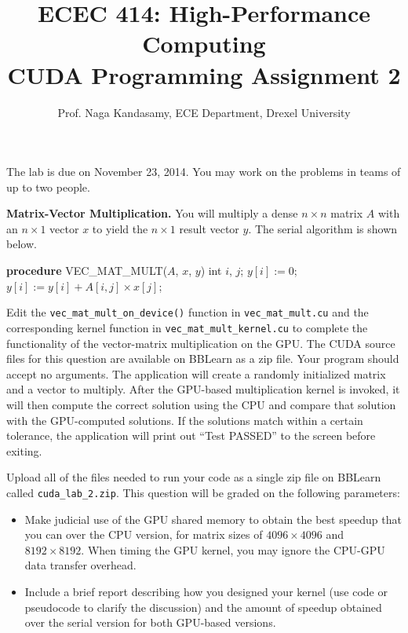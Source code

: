 \documentclass[12.0pt]{article}
\begin{document}
\title{ECEC 414: High-Performance Computing \\
CUDA Programming Assignment 2}
\author{Prof. Naga Kandasamy, ECE Department, Drexel University}
\maketitle %
\date{}

\noindent The lab is due on November 23, 2014. You may work on the problems in teams of up to two people.
\vspace{12pt}

\noindent \textbf{Matrix-Vector Multiplication.} You will multiply a dense $n \times n $ matrix $A$ with an $n \times 1$ vector $x$ to yield the $n \times 1$ result vector $y$. The serial algorithm is shown below. \vspace{12pt}

\begin{algorithm}[!h]
\begin{algorithmic}[1]
	\STATE \textbf{procedure} VEC\_MAT\_MULT($A$, $x$, $y$)
    \STATE int $i$, $j$;
        \STATE $y[i] := 0$;
				\STATE $y[i] := y[i] + A[i, j] \times x[j]$;
			\ENDFOR
	\ENDFOR
\end{algorithmic}
\end{algorithm}

\noindent Edit the \texttt{vec\_mat\_mult\_on\_device()} function in \texttt{vec\_mat\_mult.cu} and the corresponding kernel function in \texttt{vec\_mat\_mult\_kernel.cu} to complete the functionality of the vector-matrix multiplication on the GPU. The CUDA source files for this question are available on BBLearn as a zip file. Your program should accept no arguments. The application will create a randomly initialized matrix and a vector to multiply. After the GPU-based multiplication kernel is invoked, it will then compute the correct solution using the CPU and compare that solution with the GPU-computed solutions. If the solutions match within a certain tolerance, the application will print out ``Test PASSED'' to the screen before exiting. \vspace{12pt}

\noindent Upload all of the files needed to run your code as a single zip file on BBLearn called \texttt{cuda\_lab\_2.zip}. This question will be graded on the following parameters:
\begin{itemize}
\item Make judicial use of the GPU shared memory to obtain the best speedup that you can over the CPU version, for matrix sizes of $4096 \times 4096$ and $8192 \times 8192$. When timing the GPU kernel, you may ignore the CPU-GPU data transfer overhead.

\item Include a brief report describing how you designed your kernel (use code or pseudocode to clarify the discussion) and the amount of speedup obtained over the serial version for both GPU-based versions.
\end{itemize}
\pagebreak
\end{document}
